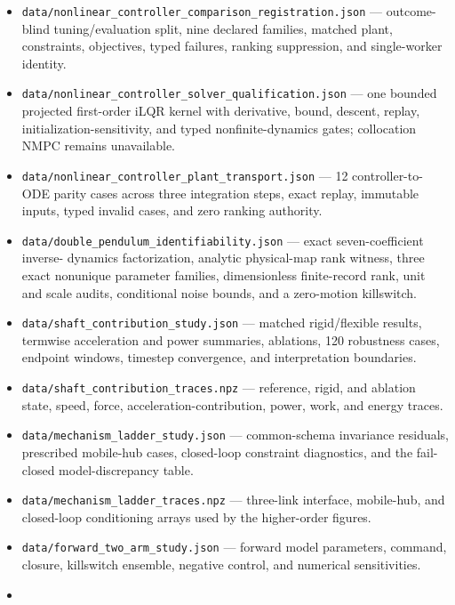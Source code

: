 \documentclass[
  letterpaper,
]{report}
\begin{document}
\begin{itemize}
  shoulder-only, wrist-only, and zero-authority delay/noise maps;
  event-state and speed arrays; integration-step refinement; and
  global-horizon truncation controls.
\item
  \texttt{data/nonlinear\_controller\_comparison\_registration.json} ---
  outcome-blind tuning/evaluation split, nine declared families, matched
  plant, constraints, objectives, typed failures, ranking suppression,
  and single-worker identity.
\item
  \texttt{data/nonlinear\_controller\_solver\_qualification.json} ---
  one bounded projected first-order iLQR kernel with derivative, bound,
  descent, replay, initialization-sensitivity, and typed
  nonfinite-dynamics gates; collocation NMPC remains unavailable.
\item
  \texttt{data/nonlinear\_controller\_plant\_transport.json} --- 12
  controller-to-ODE parity cases across three integration steps, exact
  replay, immutable inputs, typed invalid cases, and zero ranking
  authority.
\item
  \texttt{data/double\_pendulum\_identifiability.json} --- exact
  seven-coefficient inverse- dynamics factorization, analytic
  physical-map rank witness, three exact nonunique parameter families,
  dimensionless finite-record rank, unit and scale audits, conditional
  noise bounds, and a zero-motion killswitch.
\item
  \texttt{data/shaft\_contribution\_study.json} --- matched
  rigid/flexible results, termwise acceleration and power summaries,
  ablations, 120 robustness cases, endpoint windows, timestep
  convergence, and interpretation boundaries.
\item
  \texttt{data/shaft\_contribution\_traces.npz} --- reference, rigid,
  and ablation state, speed, force, acceleration-contribution, power,
  work, and energy traces.
\item
  \texttt{data/mechanism\_ladder\_study.json} --- common-schema
  invariance residuals, prescribed mobile-hub cases, closed-loop
  constraint diagnostics, and the fail-closed model-discrepancy table.
\item
  \texttt{data/mechanism\_ladder\_traces.npz} --- three-link interface,
  mobile-hub, and closed-loop conditioning arrays used by the
  higher-order figures.
\item
  \texttt{data/forward\_two\_arm\_study.json} --- forward model
  parameters, command, closure, killswitch ensemble, negative control,
  and numerical sensitivities.
\item

\end{itemize}
\end{document}
